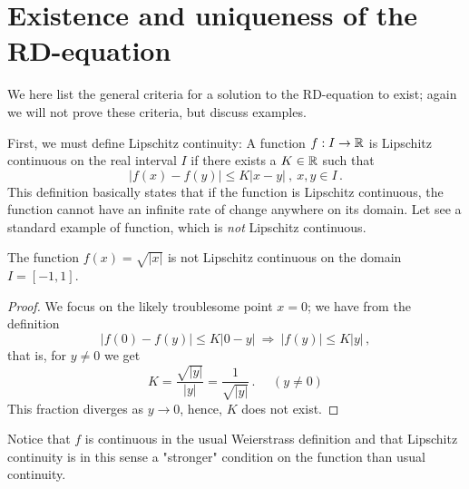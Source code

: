 \section{Existence and uniqueness of the RD-equation}
We here list the general criteria for a solution to the RD-equation to exist; 
again we will not prove these criteria, but discuss examples. 

First, we must define Lipschitz continuity: 
A function $f: I \rightarrow \mathbb{R}$ is Lipschitz continuous on the real interval $I$
if there exists a $K \in \mathbb{R}$ such that
\begin{equation}
  |f(x)-f(y)| \leq K |x-y| \ , \ x,y \in I \, .
\end{equation}
This definition basically states that if the function is Lipschitz continuous, the function 
cannot have an infinite rate of change anywhere on its domain. Let see a standard example of 
function, which is \emph{not} Lipschitz continuous.

\begin{example}
	The function $f(x) = \sqrt{|x|}$ is not Lipschitz continuous on the domain $I=[-1,1]$.

	\begin{proof}
		We focus on the likely troublesome point $x=0$; we have from the definition
		\begin{equation}
		    |f(0)-f(y)| \leq K |0-y| \ \Rightarrow \ |f(y)| \leq K|y| \, ,
		  \end{equation}
		that is, for $y \neq 0$ we get 
		\begin{equation}
		    K =\frac{\sqrt{|y|}}{|y|} = \frac{1}{\sqrt{|y|}} \, . \ \ \ \ \ \ (y \neq 0) 
		\end{equation}
		This fraction diverges as $y \rightarrow 0$, hence, $K$ does not exist. 
	\end{proof}

	\noindent Notice that $f$ is continuous in the usual Weierstrass definition 
	and that Lipschitz continuity is in this sense a 
	"stronger" condition on the function than usual continuity. 
\end{example}

